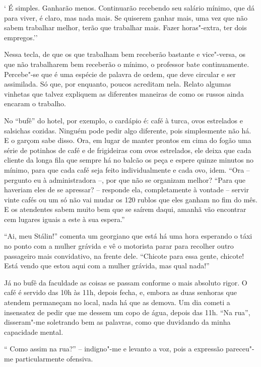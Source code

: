 ` É simples. Ganharão menos. Continuarão recebendo seu salário mínimo,
que dá para viver, é claro, mas nada mais. Se quiserem ganhar mais, uma
vez que não sabem trabalhar melhor, terão que trabalhar mais. Fazer
horas"-extra, ter dois empregos.''

Nessa tecla, de que os que trabalham bem receberão bastante e
vice"-versa, os que não trabalharem bem receberão o mínimo, o professor
bate continuamente. Percebe"-se que é uma espécie de palavra de ordem,
que deve circular e ser assimilada. Só que, por enquanto, poucos
acreditam nela. Relato algumas vinhetas que talvez expliquem as
diferentes maneiras de como os russos ainda encaram o trabalho.

No ``bufê'' do hotel, por exemplo, o cardápio é: café à turca, ovos
estrelados e salsichas cozidas. Ninguém pode pedir algo diferente, pois
simplesmente não há. E o garçom sabe disso. Ora, em lugar de manter
prontos em cima do fogão uma série de potinhos de café e de frigideiras
com ovos estrelados, ele deixa que cada cliente da longa fila que sempre
há no balcão os peça e espere quinze minutos no mínimo, para que cada
café seja feito individualmente e cada ovo, idem. ``Ora -- pergunto eu à
administradora --, por que não se organizam melhor? ``Para que haveriam
eles de se apressar? -- responde ela, completamente à vontade -- servir
vinte cafés ou um só não vai mudar os 120 rublos que eles ganham no fim
do mês. E os atendentes sabem muito bem que se saírem daqui, amanhã vão
encontrar cem lugares iguais a este à sua espera.''

``Ai, meu Stálin!'' comenta um georgiano que está há uma hora esperando
o táxi no ponto com a mulher grávida e vê o motorista parar para
recolher outro passageiro mais convidativo, na frente dele. ``Chicote
para essa gente, chicote! Está vendo que estou aqui com a mulher
grávida, mas qual nada!''

Já no bufê da faculdade as coisas se passam conforme o mais absoluto
rigor. O café é servido das 10h às 11h, depois fecha, e, embora as duas
senhoras que atendem permaneçam no local, nada há que as demova. Um dia
cometi a insensatez de pedir que me dessem um copo de água, depois das
11h. ``Na rua'', disseram"-me soletrando bem as palavras, como que
duvidando da minha capacidade mental.

`` Como assim na rua?'' -- indigno"-me e levanto a voz, pois a expressão
pareceu"-me particularmente ofensiva.

